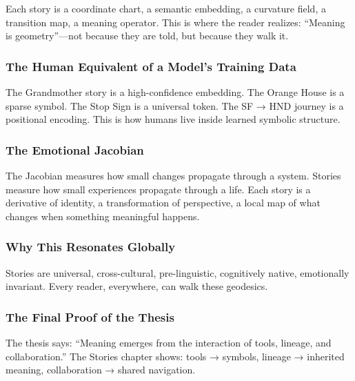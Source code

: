 \documentclass[
]{article}
\begin{document}
Each story is a coordinate chart, a semantic embedding, a curvature
field, a transition map, a meaning operator. This is where the reader
realizes: ``Meaning is geometry''---not because they are told, but
because they walk it.

\hypertarget{the-human-equivalent-of-a-models-training-data}{%
\subsubsection{The Human Equivalent of a Model's Training
Data}\label{the-human-equivalent-of-a-models-training-data}}

The Grandmother story is a high-confidence embedding. The Orange House
is a sparse symbol. The Stop Sign is a universal token. The SF → HND
journey is a positional encoding. This is how humans live inside learned
symbolic structure.

\hypertarget{the-emotional-jacobian}{%
\subsubsection{The Emotional Jacobian}\label{the-emotional-jacobian}}

The Jacobian measures how small changes propagate through a system.
Stories measure how small experiences propagate through a life. Each
story is a derivative of identity, a transformation of perspective, a
local map of what changes when something meaningful happens.

\hypertarget{why-this-resonates-globally}{%
\subsubsection{Why This Resonates
Globally}\label{why-this-resonates-globally}}

Stories are universal, cross-cultural, pre-linguistic, cognitively
native, emotionally invariant. Every reader, everywhere, can walk these
geodesics.

\hypertarget{the-final-proof-of-the-thesis}{%
\subsubsection{The Final Proof of the
Thesis}\label{the-final-proof-of-the-thesis}}

The thesis says: ``Meaning emerges from the interaction of tools,
lineage, and collaboration.'' The Stories chapter shows: tools →
symbols, lineage → inherited meaning, collaboration → shared navigation.
\end{document}
